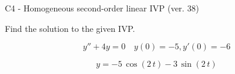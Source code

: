 \begin{exercise}
  \begin{exerciseTitle}C4 - Homogeneous second-order linear IVP (ver. 38)\end{exerciseTitle}
  \begin{exerciseStatement}
    
Find the solution to the given IVP.

    
\[y''+4y = 0 \hspace{1em} y(0) = -5 , y'(0) = -6\]

  \end{exerciseStatement}
  \begin{exerciseAnswer}
    
\[y= -5 \, \cos\left(2 \, t\right) - 3 \, \sin\left(2 \, t\right)\]

  \end{exerciseAnswer}
\end{exercise}